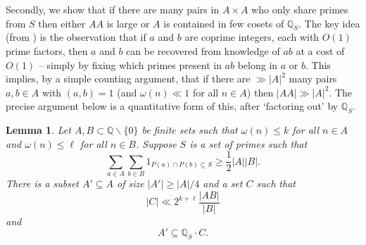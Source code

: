 \documentclass{amsart}
\renewcommand{\leq}{\leqslant}
\renewcommand{\geq}{\geqslant}
\newcommand{\bbq}{\mathbb{Q}}
\newcommand{\abs}[1]{\left\lvert #1\right\rvert}
\newtheorem{lemma}{Lemma}
\theoremstyle{definition}
\begin{document}
Secondly, we show that if there are many pairs in $A\times A$ who only share primes from $S$ then either $AA$ is large or $A$ is contained in few cosets of $\bbq_S$. The key idea (from \cite{HRSZ25}) is the observation that if $a$ and $b$ are coprime integers, each with $O(1)$ prime factors, then $a$ and $b$ can be recovered from knowledge of $ab$ at a cost of $O(1)$ -- simply by fixing which primes present in $ab$ belong in $a$ or $b$. This implies, by a simple counting argument, that if there are $\gg \abs{A}^2$ many pairs $a,b\in A$ with $(a,b)=1$ (and $\omega(n)\ll 1$ for all $n\in A$) then $\abs{AA}\gg \abs{A}^2$. The precise argument below is a quantitative form of this, after `factoring out' by $\bbq_S$.

\begin{lemma}\label{lem-warmup2}
Let $A,B\subset \bbq\backslash \{0\}$ be finite sets such that $\omega(n)\leq k$ for all $n\in A$ and $\omega(n)\leq \ell$ for all $n\in B$. Suppose $S$ is a set of primes such that 
\[\sum_{a\in A}\sum_{b\in B}1_{P(a)\cap P(b)\subseteq S}\geq \frac{1}{2}\abs{A}\abs{B}.\]
There is a subset $A'\subseteq A$ of size $\abs{A'}\ge \abs{A}/4$ and a set $C$ such that 
\[\abs{C}\ll 2^{k+\ell}\frac{\abs{AB}}{\abs{B}}\]
and
\[A'\subseteq \bbq_S \cdot C.\]
\end{lemma}
\end{document}
